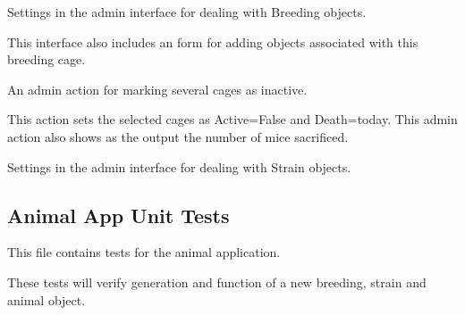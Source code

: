 \documentclass[letterpaper,10pt,english]{sphinxmanual}
\begin{document}

\begin{fulllineitems}
\label{animals:mousedb.animal.admin.BreedingAdmin}
Settings in the admin interface for dealing with Breeding objects.

This interface also includes an form for adding objects associated with this breeding cage.

\begin{fulllineitems}
\label{animals:mousedb.animal.admin.BreedingAdmin.mark_deactivated}
An admin action for marking several cages as inactive.

This action sets the selected cages as Active=False and Death=today.
This admin action also shows as the output the number of mice sacrificed.

\end{fulllineitems}


\end{fulllineitems}


\begin{fulllineitems}
\label{animals:mousedb.animal.admin.StrainAdmin}
Settings in the admin interface for dealing with Strain objects.

\end{fulllineitems}



\subsection{Animal App Unit Tests}
\label{animals:animal-app-unit-tests}\label{animals:module-mousedb.animal.tests}
This file contains tests for the animal application.

These tests will verify generation and function of a new breeding, strain and animal object.
\end{document}
